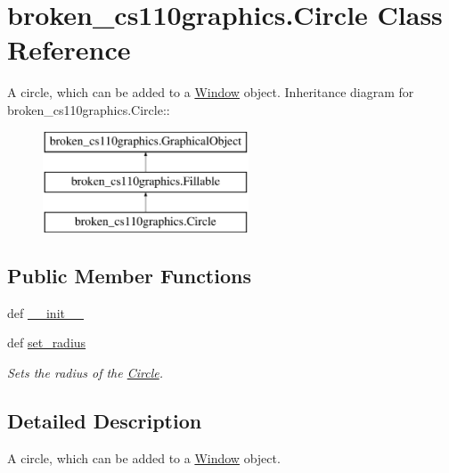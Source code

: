 \hypertarget{classbroken__cs110graphics_1_1Circle}{
\section{broken\_\-cs110graphics.Circle Class Reference}
\label{classbroken__cs110graphics_1_1Circle}
}


A circle, which can be added to a \hyperlink{classbroken__cs110graphics_1_1Window}{Window} object.  
Inheritance diagram for broken\_\-cs110graphics.Circle::\begin{figure}[H]
\begin{center}
\leavevmode
\includegraphics[height=3cm]{classbroken__cs110graphics_1_1Circle}
\end{center}
\end{figure}
\subsection*{Public Member Functions}
\begin{DoxyCompactItemize}
\item 
def \hyperlink{classbroken__cs110graphics_1_1Circle_a4f51b9f8f5e8ea901532610e40024fb5}{\_\-\_\-init\_\-\_\-}
\item 
def \hyperlink{classbroken__cs110graphics_1_1Circle_afd1898ddb6e5e6d51992e7b63332135b}{set\_\-radius}
\begin{DoxyCompactList}\small\item\em Sets the radius of the \hyperlink{classbroken__cs110graphics_1_1Circle}{Circle}. \item\end{DoxyCompactList}\end{DoxyCompactItemize}


\subsection{Detailed Description}
A circle, which can be added to a \hyperlink{classbroken__cs110graphics_1_1Window}{Window} object. 

